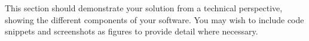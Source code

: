 This section should demonstrate your solution from a technical perspective, showing the different components of your software. You may wish to include code snippets and screenshots as figures to provide detail where necessary.